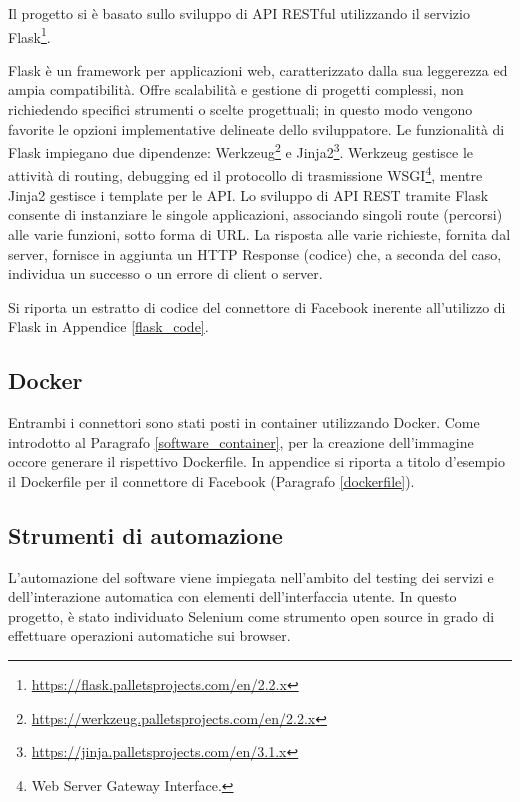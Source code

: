 Il progetto si \`e basato sullo sviluppo di API RESTful utilizzando il servizio Flask\footnote{\url{https://flask.palletsprojects.com/en/2.2.x}}.

Flask \`e un framework per applicazioni web, caratterizzato dalla sua leggerezza ed ampia compatibilit\`a. Offre scalabilit\`a e gestione di progetti complessi, non richiedendo specifici strumenti o scelte progettuali; in questo modo vengono favorite le opzioni implementative delineate dello sviluppatore.
Le funzionalit\`a di Flask impiegano due dipendenze: Werkzeug\footnote{\url{https://werkzeug.palletsprojects.com/en/2.2.x}} e Jinja2\footnote{\url{https://jinja.palletsprojects.com/en/3.1.x}}.
Werkzeug gestisce le attivit\`a di routing, debugging ed il protocollo di trasmissione WSGI\footnote{Web Server Gateway Interface.}, mentre Jinja2 gestisce i template per le API.
Lo sviluppo di API REST tramite Flask consente di instanziare le singole applicazioni, associando singoli route (percorsi) alle varie funzioni, sotto forma di URL.
La risposta alle varie richieste, fornita dal server, fornisce in aggiunta un HTTP Response (codice) che, a seconda del caso, individua un successo o un errore di client o server.\cite{grinberg2018flask}

Si riporta un estratto di codice del connettore di Facebook inerente all'utilizzo di Flask in Appendice \ref{flask_code}.



\subsection{Docker}
Entrambi i connettori sono stati posti in container utilizzando Docker. Come introdotto al Paragrafo \ref{software_container}, per la creazione dell'immagine occore generare il rispettivo Dockerfile. In appendice si riporta a titolo d'esempio il Dockerfile per il connettore di Facebook (Paragrafo \ref{dockerfile}).





\subsection{Strumenti di automazione}
L'automazione del software viene impiegata nell'ambito del testing dei servizi e dell'interazione automatica con elementi dell'interfaccia utente. In questo progetto, \`e stato individuato Selenium come strumento open source in grado di effettuare operazioni automatiche sui browser.


